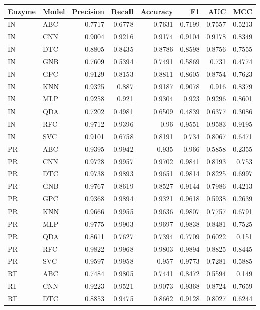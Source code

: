 \begin{tabular}{llrrrrrr}
\toprule
Enzyme & Model & Precision & Recall & Accuracy & F1 & AUC & MCC \\
\midrule
IN & ABC & 0.7717 & 0.6778 & 0.7631 & 0.7199 & 0.7557 & 0.5213 \\
IN & CNN & 0.9004 & 0.9216 & 0.9174 & 0.9104 & 0.9178 & 0.8349 \\
IN & DTC & 0.8805 & 0.8435 & 0.8786 & 0.8598 & 0.8756 & 0.7555 \\
IN & GNB & 0.7609 & 0.5394 & 0.7491 & 0.5869 & 0.731 & 0.4774 \\
IN & GPC & 0.9129 & 0.8153 & 0.8811 & 0.8605 & 0.8754 & 0.7623 \\
IN & KNN & 0.9325 & 0.887 & 0.9187 & 0.9078 & 0.916 & 0.8379 \\
IN & MLP & 0.9258 & 0.921 & 0.9304 & 0.923 & 0.9296 & 0.8601 \\
IN & QDA & 0.7202 & 0.4981 & 0.6509 & 0.4839 & 0.6377 & 0.3086 \\
IN & RFC & 0.9712 & 0.9396 & 0.96 & 0.9551 & 0.9583 & 0.9195 \\
IN & SVC & 0.9101 & 0.6758 & 0.8191 & 0.734 & 0.8067 & 0.6471 \\
PR & ABC & 0.9395 & 0.9942 & 0.935 & 0.966 & 0.5858 & 0.2355 \\
PR & CNN & 0.9728 & 0.9957 & 0.9702 & 0.9841 & 0.8193 & 0.753 \\
PR & DTC & 0.9738 & 0.9893 & 0.9651 & 0.9814 & 0.8225 & 0.6997 \\
PR & GNB & 0.9767 & 0.8619 & 0.8527 & 0.9144 & 0.7986 & 0.4213 \\
PR & GPC & 0.9368 & 0.9894 & 0.9321 & 0.9618 & 0.5938 & 0.2639 \\
PR & KNN & 0.9666 & 0.9955 & 0.9636 & 0.9807 & 0.7757 & 0.6791 \\
PR & MLP & 0.9775 & 0.9903 & 0.9697 & 0.9838 & 0.8481 & 0.7525 \\
PR & QDA & 0.8611 & 0.7627 & 0.7394 & 0.7709 & 0.6022 & 0.151 \\
PR & RFC & 0.9822 & 0.9968 & 0.9803 & 0.9894 & 0.8825 & 0.8445 \\
PR & SVC & 0.9597 & 0.9958 & 0.957 & 0.9773 & 0.7281 & 0.5885 \\
RT & ABC & 0.7484 & 0.9805 & 0.7441 & 0.8472 & 0.5594 & 0.149 \\
RT & CNN & 0.9223 & 0.9521 & 0.9073 & 0.9368 & 0.8724 & 0.7659 \\
RT & DTC & 0.8853 & 0.9475 & 0.8662 & 0.9128 & 0.8027 & 0.6244 \\

\end{tabular}
